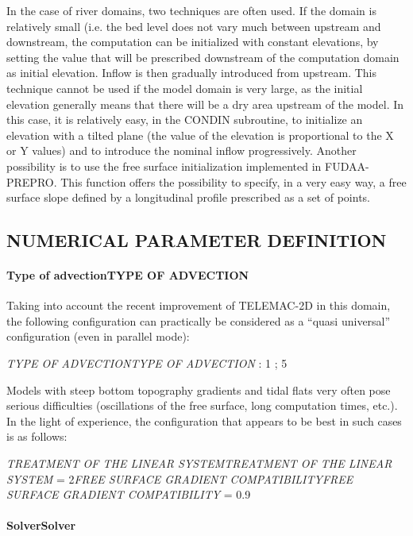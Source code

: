 \documentclass{article} %
\begin{document}
 In the case of river domains, two techniques are often used. If the domain is relatively small (i.e. the bed level does not vary much between upstream and downstream, the computation can be initialized with constant elevations, by setting the value that will be prescribed downstream of the computation domain as initial elevation. Inflow is then gradually introduced from upstream. This technique cannot be used if the model domain is very large, as the initial elevation generally means that there will be a dry area upstream of the model.  In this case, it is relatively easy, in the CONDIN subroutine, to initialize an elevation with a tilted plane (the value of the elevation is proportional to the X or Y values) and to introduce the nominal inflow progressively. Another possibility is to use the free surface initialization implemented in FUDAA-PREPRO. This function offers the possibility to specify, in a very easy way, a free surface slope defined by a longitudinal profile prescribed as a set of points.


\subsection{ NUMERICAL PARAMETER DEFINITION}


\paragraph{ Type of advectionTYPE OF ADVECTION}

 Taking into account the recent improvement of TELEMAC-2D in this domain, the following configuration can practically be considered as a ``quasi universal'' configuration (even in parallel mode):

 \textit{TYPE OF ADVECTIONTYPE OF ADVECTION} :  1 ; 5

 Models with steep bottom topography gradients and tidal flats very often pose serious difficulties (oscillations of the free surface, long computation times, etc.). In the light of experience, the configuration that appears to be best in such cases is as follows:

 \textit{TREATMENT OF THE LINEAR SYSTEMTREATMENT OF THE LINEAR SYSTEM} = 2\textit{FREE SURFACE GRADIENT COMPATIBILITYFREE SURFACE GRADIENT COMPATIBILITY} = 0.9


\paragraph{ SolverSolver}
\end{document}
